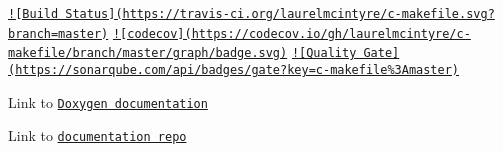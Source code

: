 \href{https://travis-ci.org/laurelmcintyre/c-makefile}{\tt !\mbox{[}Build Status\mbox{]}(https\-://travis-\/ci.\-org/laurelmcintyre/c-\/makefile.\-svg?branch=master)} \href{https://codecov.io/gh/laurelmcintyre/c-makefile}{\tt !\mbox{[}codecov\mbox{]}(https\-://codecov.\-io/gh/laurelmcintyre/c-\/makefile/branch/master/graph/badge.\-svg)} \href{https://sonarqube.com/dashboard?id=c-makefile%3Amaster}{\tt !\mbox{[}Quality Gate\mbox{]}(https\-://sonarqube.\-com/api/badges/gate?key=c-\/makefile\%3\-Amaster)}

Link to \href{https://laurelmcintyre.github.io/c-makefile/html/}{\tt Doxygen documentation}

Link to \href{https://github.com/laurelmcintyre/documentation}{\tt documentation repo} 